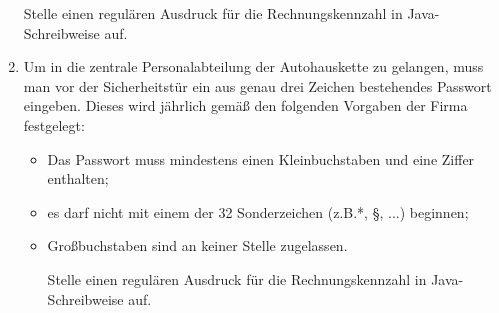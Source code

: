 \documentclass{lehramt-informatik-aufgabe}
\begin{document}
\begin{enumerate}
Stelle einen regulären Ausdruck für die Rechnungskennzahl in
Java-Schreibweise auf.

\begin{liAntwort}
\end{liAntwort}


\item Um in die zentrale Personalabteilung der Autohauskette zu
gelangen, muss man vor der Sicherheitstür ein aus genau drei Zeichen
bestehendes Passwort eingeben. Dieses wird jährlich gemäß den
folgenden Vorgaben der Firma festgelegt:

\begin{itemize}
\item Das Passwort muss mindestens einen Kleinbuchstaben und eine Ziffer
enthalten;

\item es darf nicht mit einem der 32 Sonderzeichen (z.B.*, §, ...)
beginnen;

\item Großbuchstaben sind an keiner Stelle zugelassen.

Stelle einen regulären Ausdruck für die Rechnungskennzahl in
Java-Schreibweise auf.
\end{itemize}

\begin{liAntwort}
\end{liAntwort}

\end{enumerate}
\end{document}
